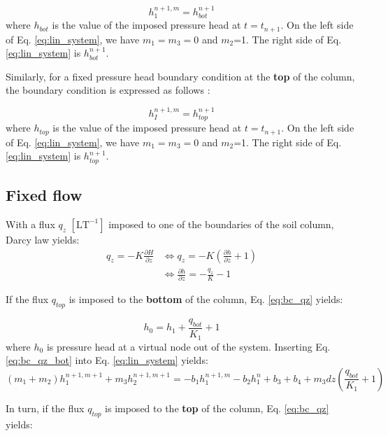 \documentclass[a4paper,12pt]{article}
\begin{document}
\begin{equation}\label{eq:bc_fixed_bot}
    h_1^{n+1,m} = h_{bot}^{n+1}
\end{equation}
where $h_{bot}$ is the value of the imposed pressure head at $t = t_{n+1}$. On the left side of Eq. \ref{eq:lin_system}, we have $m_1 = m_3 = 0$ and $m_2$=1. The right side of Eq. \ref{eq:lin_system} is $h_{bot}^{n+1}$.

Similarly, for a fixed pressure head boundary condition at the \textbf{top} of the column, the boundary condition is expressed as follows :

\begin{equation} \label{eq:bc_fixed_top}
    h_I^{n+1,m} = h_{top}^{n+1}
\end{equation}
where $h_{top}$ is the value of the imposed pressure head at $t = t_{n+1}$. On the left side of Eq. \ref{eq:lin_system}, we have $m_1 = m_3 = 0$ and $m_2$=1. The right side of Eq. \ref{eq:lin_system} is $h_{top}^{n+1}$.


\subsection{Fixed flow}

With a flux $q_z$ $\mathrm{[LT^{-1}]}$ imposed to one of the boundaries of the soil column, Darcy law yields: 
\begin{align} \label{eq:bc_qz}
    q_z = -K \frac{\partial H}{\partial z} &\iff q_z= -K \left( \frac{\partial h}{\partial z} + 1 \right) \nonumber \\
					   &\iff \frac{\partial h}{\partial z} = - \frac{q_z}{K} - 1 
\end{align}

If the flux $q_{top}$ is imposed to the \textbf{bottom} of the column, Eq. \ref{eq:bc_qz} yields:

\begin{equation} \label{eq:bc_qz_bot}
     h_0 = h_1  + \frac{q_{bot}}{K_1} + 1
\end{equation}
where $h_{0}$ is pressure head at a virtual node out of the system. Inserting Eq. \ref{eq:bc_qz_bot} into Eq. \ref{eq:lin_system} yields: 
\begin{equation} \label{eq:bc_qz_lin_system_bot}
    (m_1 + m_2) h_1^{n+1,m+1} + m_3 h_{2}^{n+1,m+1} = - b_1 h_1^{n+1,m} - b_2 h_1^n + b_3 + b_4 + m_3 dz \left( \frac{q_{bot}}{K_1} +1 \right)
\end{equation}

In turn, if the flux $q_{top}$ is imposed to the \textbf{top} of the column, Eq. \ref{eq:bc_qz} yields:
\end{document}
